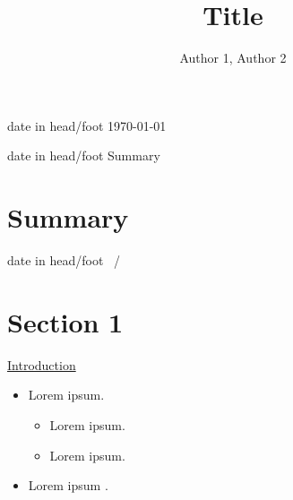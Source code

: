 \documentclass{beamer}
\title{Title}
\author{Author 1, Author 2} %
\institute{Universit\'e du Qu\'ebec \`A Chicoutimi} %
\date{} %
\begin{document}
{
\begin{beamercolorbox}[wd=.333333\paperwidth,ht=2.25ex,dp=1ex,right]{date in head/foot}%
    \today\hspace*{2ex} 
\end{beamercolorbox}
}
\begin{frame}
\titlepage
\end{frame}

{
\begin{beamercolorbox}[wd=.333333\paperwidth,ht=2.25ex,dp=1ex,right]{date in head/foot}%
    Summary\hspace*{2ex} 
\end{beamercolorbox}
}

\section*{Summary}
\begin{frame}
  \tableofcontents[hideallsubsections]
\end{frame}
{
\begin{beamercolorbox}[wd=.333333\paperwidth,ht=2.25ex,dp=1ex,right]{date in head/foot}%
    \insertframenumber ~/ \inserttotalframenumber\hspace*{2ex} 
\end{beamercolorbox}
}
\addtocounter{framenumber}{-1}
\setcounter{framenumber}{0}

\section{Section 1}
\begin{frame}
\begin{center}
\underline{Introduction}\\
\end{center}
\begin{itemize}
\item Lorem ipsum.
	\begin{itemize}
	\item Lorem ipsum.
	\item Lorem ipsum.
	\end{itemize}
\item Lorem ipsum \cite{RN1}.
\end{itemize}
\end{frame}
\end{document}
